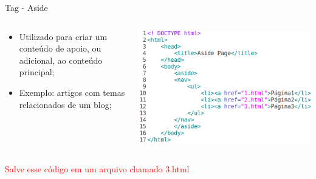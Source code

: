 \documentclass{beamer}
\begin{document}
\begin{frame}{Tag - Aside}
  \begin{columns}
    \begin{column}{0.4 \textwidth}
      \footnotesize
      \begin{itemize}
	\item Utilizado para criar um conteúdo de apoio, ou adicional,
ao conteúdo principal;
	 \item Exemplo: artigos com temas relacionados de um blog;
      \end{itemize}
    \end{column}
    \begin{column}{0.6\textwidth}
     \includegraphics[height=0.45\paperheight]{fig/aula1/html18.png}
    \end{column}
  \end{columns}
  \textcolor{red}{Salve esse código em um arquivo chamado 3.html}
\end{frame}
\end{document}
